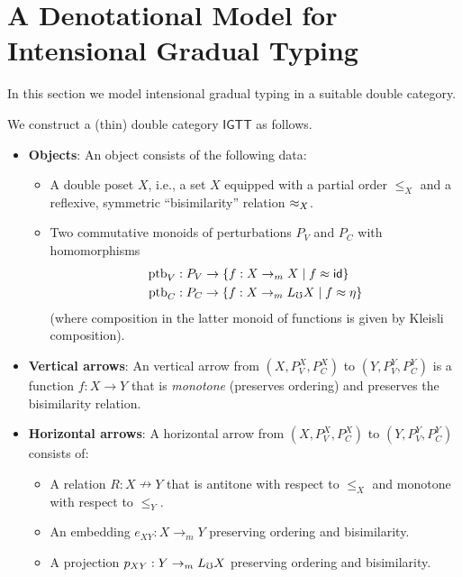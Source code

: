 \section{A Denotational Model for Intensional Gradual Typing}

In this section we model intensional gradual typing in a suitable double category.

We construct a (thin) double category $\mathsf{IGTT}$ as follows.


\begin{itemize}
  \item \textbf{Objects}: An object consists of the following data:
    \begin{itemize}
        \item A double poset $X$, i.e., a set $X$ equipped with a partial order $\le_X$
        and a reflexive, symmetric ``bisimilarity'' relation $\approx_X$.
        \item Two commutative monoids of perturbations $P_V$ and $P_C$ with homomorphisms
        \begin{align*}
        \text{ptb}_V &: P_V \to \{ f : X \to_m X \mid f \approx \mathsf{id} \} \\
        \text{ptb}_C &: P_C \to \{ f : X \to_m L_\mho X \mid f \approx \eta \}
        \end{align*}
        (where composition in the latter monoid of functions is given by Kleisli composition).

    \end{itemize}

  \item \textbf{Vertical arrows}: An vertical arrow from $(X, P_V^X, P_C^X)$ to $(Y, P_V^Y, P_C^Y)$ is
  a function $f : X \to Y$ that is \emph{monotone} (preserves ordering) and preserves the bisimilarity relation.
  
  \item \textbf{Horizontal arrows}: A horizontal arrow from $(X, P_V^X, P_C^X)$ to $(Y, P_V^Y, P_C^Y)$
  consists of:
  \begin{itemize}
    \item A relation $R : X \nrightarrow Y$ that is antitone with respect to $\le_X$ and
    monotone with respect to $\le_Y$.
    \item An embedding $e_{XY} : X \to_m Y$ preserving ordering and bisimilarity.
    \item A projection $p_{XY} : Y \to_m L_\mho X$ preserving ordering and bisimilarity.
  \end{itemize}
  

\end{itemize}
